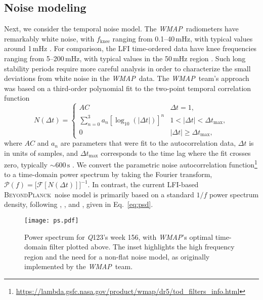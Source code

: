 \documentclass[twocolumn]{aa}
\def\WMAP{\emph{WMAP}}
\newcommand{\BP}{\textsc{BeyondPlanck}}
\newcommand{\Q}[0]{\textit Q}
\begin{document}
\subsection{Noise modeling}

\label{sec:psd}


Next, we consider the temporal noise model.  The \WMAP\ radiometers have
remarkably white noise, with $f_\mathrm{knee}$ ranging from 0.1--40\,mHz, with
typical values around 1\,mHz \citep{jarosik2003}. For comparison, the LFI
time-ordered data have knee frequencies ranging from 5--200\,mHz, with typical
values in the 50\,mHz region \citep{bp06}. Such long stability periods require
more careful analysis in order to characterize the small deviations from white
noise in the \WMAP\ data.  The \WMAP\ team's approach was based on a
third-order polynomial fit to the two-point temporal correlation function
\begin{equation}
	N(\Delta t)=
	\begin{cases}
		AC & \Delta t=1,
		\\
		\displaystyle{\sum_{n=0}^3} a_n[\log_{10}(|\Delta t|)]^n & 1<|\Delta t|<\Delta t_\mathrm{max},
		\\
		0 & |\Delta t|\geq \Delta t_\mathrm{max},
	\end{cases}
	\label{eq:noise_acf}
\end{equation}
where $AC$ and $a_n$ are parameters that were fit to the autocorrelation data,
$\Delta t$ is in units of samples, and $\Delta t_\mathrm{max}$ corresponds to
the time lag where the fit crosses zero, typically $\sim600\,\mathrm s$
\citep{jarosik2007}.  We convert the parametric noise autocorrelation function\footnote{\url{https://lambda.gsfc.nasa.gov/product/wmap/dr5/tod_filters_info.html}}
to a time-domain power spectrum by taking the Fourier transform, $\mathcal P(f)=\Big[\mathcal
F[N(\Delta t)]\Big]^{-1}$. In contrast, the current LFI-based \BP\ noise model
is primarily based on a standard $1/f$ power spectrum density, following
\citet{planck2013-p03}, \citet{planck2014-a03}, and \citet{planck2016-l02},
given in Eq.~\eqref{eq:psd}.

\begin{figure}
	\texttt{[image: ps.pdf]}
	\caption{Power spectrum for \Q123's week 156, with \WMAP{}'s optimal time-domain filter plotted above. The inset highlights the high frequency region and the need for a non-flat noise model, as originally implemented by the \WMAP\ team.}
	\label{fig:pid_psd}
\end{figure}
\end{document}
